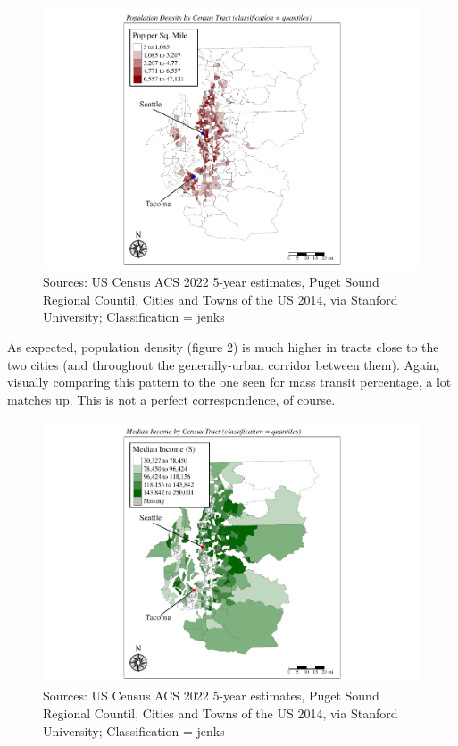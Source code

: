 \documentclass[
]{article}
\begin{document}
\begin{figure}
\centering
\includegraphics{transit-hotspots-PSRC_files/figure-latex/unnamed-chunk-5-1.pdf}
\caption{Sources: US Census ACS 2022 5-year estimates, Puget Sound
Regional Countil, Cities and Towns of the US 2014, via Stanford
University; Classification = jenks}
\end{figure}

As expected, population density (figure 2) is much higher in tracts
close to the two cities (and throughout the generally-urban corridor
between them). Again, visually comparing this pattern to the one seen
for mass transit percentage, a lot matches up. This is not a perfect
correspondence, of course.

\newpage

\begin{figure}
\centering
\includegraphics{transit-hotspots-PSRC_files/figure-latex/unnamed-chunk-6-1.pdf}
\caption{Sources: US Census ACS 2022 5-year estimates, Puget Sound
Regional Countil, Cities and Towns of the US 2014, via Stanford
University; Classification = jenks}
\end{figure}
\end{document}
